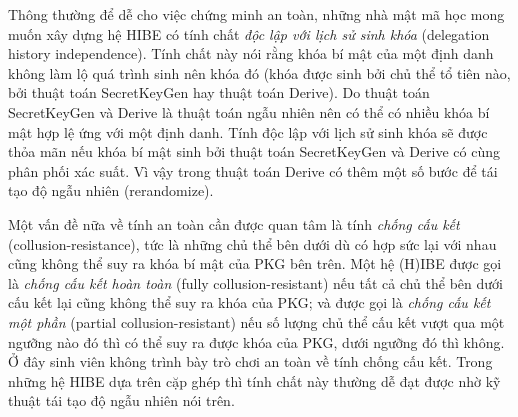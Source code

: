 \documentclass[class=report, crop=false]{standalone}
\begin{document}
			Thông thường để dễ cho việc chứng minh an toàn, những nhà mật mã học mong muốn xây dựng hệ HIBE có tính chất \textit{độc lập với lịch sử sinh khóa} (delegation history independence). Tính chất này nói rằng khóa bí mật của một định danh không làm lộ quá trình sinh nên khóa đó (khóa được sinh bởi chủ thể tổ tiên nào, bởi thuật toán \textsf{SecretKeyGen} hay thuật toán \textsf{Derive}). Do thuật toán \textsf{SecretKeyGen} và \textsf{Derive} là thuật toán ngẫu nhiên nên có thể có nhiều khóa bí mật hợp lệ ứng với một định danh. Tính độc lập với lịch sử sinh khóa sẽ được thỏa mãn nếu khóa bí mật sinh bởi thuật toán \textsf{SecretKeyGen} và \textsf{Derive} có cùng phân phối xác suất. Vì vậy trong thuật toán \textsf{Derive} có thêm một số bước để tái tạo độ ngẫu nhiên (rerandomize).
			
			Một vấn đề nữa về tính an toàn cần được quan tâm là tính \textit{chống cấu kết} (collusion-resistance), tức là những chủ thể bên dưới dù có hợp sức lại với nhau cũng không thể suy ra khóa bí mật của PKG bên trên. Một hệ (H)IBE được gọi là \textit{chống cấu kết hoàn toàn} (fully collusion-resistant) nếu tất cả chủ thể bên dưới cấu kết lại cũng không thể suy ra khóa của PKG; và được gọi là \textit{chống cấu kết một phần} (partial collusion-resistant) nếu số lượng chủ thể cấu kết vượt qua một ngưỡng nào đó thì có thể suy ra được khóa của PKG, dưới ngưỡng đó thì không. Ở đây sinh viên không trình bày trò chơi an toàn về tính chống cấu kết. Trong những hệ HIBE dựa trên cặp ghép thì tính chất này thường dễ đạt được nhờ kỹ thuật tái tạo độ ngẫu nhiên nói trên.
\end{document}
